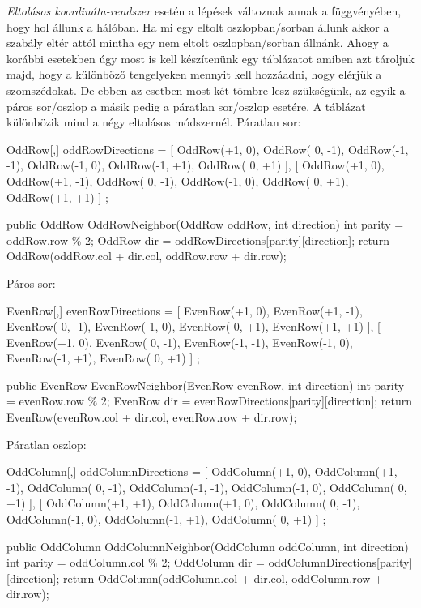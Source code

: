 \noindent \textit{Eltolásos koordináta-rendszer} esetén a lépések változnak annak a függvényében, hogy hol állunk a hálóban. Ha mi egy eltolt oszlopban/sorban állunk akkor a szabály eltér attól mintha egy nem eltolt oszlopban/sorban állnánk.
\newline
\newline Ahogy a korábbi esetekben úgy most is kell készítenünk egy táblázatot amiben azt tároljuk majd, hogy a különböző tengelyeken mennyit kell hozzáadni, hogy elérjük a szomszédokat. De ebben az esetben most két tömbre lesz szükségünk, az egyik a páros sor/oszlop a másik pedig a páratlan sor/oszlop esetére.
\newline
\newline A táblázat különbözik mind a négy eltolásos módszernél.
\newline
\newline Páratlan sor: 
\begin{cpp}
OddRow[,] oddRowDirections = 
{ 
   [ 
      OddRow(+1,  0), OddRow( 0, -1), OddRow(-1, -1),
      OddRow(-1,  0), OddRow(-1, +1), OddRow( 0, +1) 
   ],
   [ 
      OddRow(+1,  0), OddRow(+1, -1), OddRow( 0, -1),
      OddRow(-1,  0), OddRow( 0, +1), OddRow(+1, +1) 
   ]
};

public OddRow OddRowNeighbor(OddRow oddRow, int direction)
{
   int parity = oddRow.row \% 2;
   OddRow dir = oddRowDirections[parity][direction];
   return OddRow(oddRow.col + dir.col, oddRow.row + dir.row);
}   
\end{cpp}

Páros sor: 
\begin{cpp}  
EvenRow[,] evenRowDirections = 
{ 
   [
      EvenRow(+1,  0), EvenRow(+1, -1), EvenRow( 0, -1),
      EvenRow(-1,  0), EvenRow( 0, +1), EvenRow(+1, +1) 
   ],
   [ 
      EvenRow(+1,  0), EvenRow( 0, -1), EvenRow(-1, -1),
      EvenRow(-1,  0), EvenRow(-1, +1), EvenRow( 0, +1) 
   ]
};

public EvenRow EvenRowNeighbor(EvenRow evenRow, int direction)
{
   int parity = evenRow.row \% 2;
   EvenRow dir = evenRowDirections[parity][direction];
   return EvenRow(evenRow.col + dir.col, evenRow.row + dir.row);
}   
\end{cpp}

Páratlan oszlop: 
\begin{cpp}
OddColumn[,] oddColumnDirections = 
{ 
   [ 
      OddColumn(+1,  0), OddColumn(+1, -1), OddColumn( 0, -1),
      OddColumn(-1, -1), OddColumn(-1,  0), OddColumn( 0, +1) 
   ],
   [ 
      OddColumn(+1, +1), OddColumn(+1,  0), OddColumn( 0, -1),
      OddColumn(-1,  0), OddColumn(-1, +1), OddColumn( 0, +1) 
   ]
};

public OddColumn OddColumnNeighbor(OddColumn oddColumn, int direction)
{
   int parity = oddColumn.col \% 2;
   OddColumn dir = oddColumnDirections[parity][direction];
   return OddColumn(oddColumn.col + dir.col, oddColumn.row + dir.row);
}   
\end{cpp}

